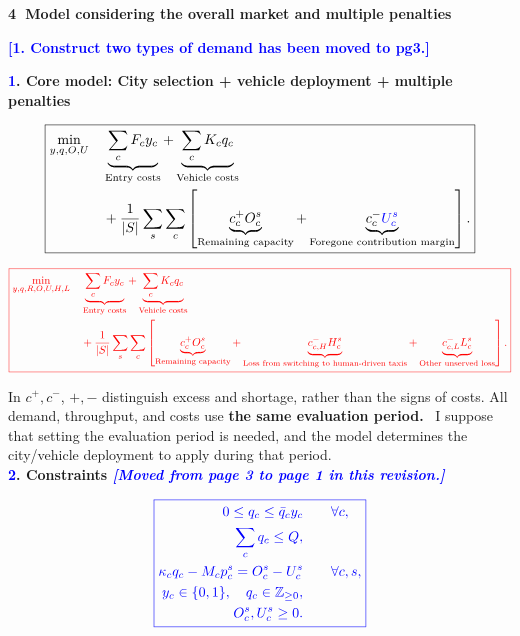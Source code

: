 \documentclass[10pt,a4paper]{article}
\newcommand{\hd}[1]{\par\vspace{8pt}\textbf{#1}\par\vspace{3pt}}
\newcommand{\circnum}[1]{\textcircled{\scriptsize #1}}
\newcommand{\note}{\textreferencemark\ }
\newcommand{\under}[2]{\underbrace{#1}_{\text{#2}}}
\begin{document}
\hd{\circnum{4} Model considering the overall market and multiple penalties}

\hd{\textcolor{blue}{\textbf{[1. Construct two types of demand has been moved to pg3.]}
}}



\hd{\textcolor{blue}{1}. Core model: City selection + vehicle deployment + multiple penalties}

\[
\boxed{\begin{aligned}
\min_{y,q,O,U}\quad
&\under{\sum_c F_c y_c}{Entry costs}
+\under{\sum_c K_c q_c}{Vehicle costs}\\
&+\frac{1}{|S|}\sum_s\sum_c\left[
\under{c_c^+O_c^s}{Remaining capacity}
+\under{c_c^-\textcolor{blue}{U_c^s}}{Foregone contribution margin}
\right].
\end{aligned}}
\]

\[
{\color{red}
\boxed{\begin{aligned}
\min_{y,q,R,O,U,H,L}\quad
&\under{\sum_c F_c y_c}{Entry costs}
+\under{\sum_c K_c q_c}{Vehicle costs}\\
&+\frac{1}{|S|}\sum_s\sum_c\left[
\under{c_c^+O_c^s}{Remaining capacity}
+\under{c_{c,H}^-H_c^s}{Loss from switching to human-driven taxis}
+\under{c_{c,L}^-L_c^s}{Other unserved loss}
\right].
\end{aligned}}
}
\]

In $c^+,c^-$, $+,-$ distinguish excess and shortage, rather than the signs of costs. All demand, throughput, and costs use \textbf{the same evaluation period.} \note I suppose that setting the evaluation period is needed, and the model determines the city/vehicle deployment to apply during that period. 
\\

\textbf{\textcolor{blue}{2}. Constraints \textcolor{blue}{\small\textit{
[Moved from page 3 to page 1 in this revision.]
}}}

\[
\textcolor{blue}{
\boxed{\begin{aligned}
0\le q_c\le\bar q_c y_c&\qquad\forall c,\\
\sum_c q_c\le Q,&\\
\kappa_c q_c-M_c p_c^s=O_c^s-U_c^s
&\qquad\forall c,s,\\
y_c\in\{0,1\},\quad q_c\in\mathbb Z_{\ge0},&\\
O_c^s,U_c^s\ge0.&
\end{aligned}}
}
\]
\end{document}
